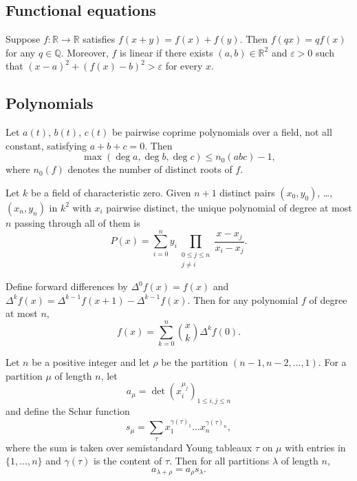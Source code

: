 \documentclass[11pt]{scrartcl}
\providecommand{\eps}{\varepsilon}
\providecommand{\QQ}{\mathbb Q}
\providecommand{\RR}{\mathbb R}
\begin{document}
\subsection{Functional equations}
\begin{theorem}
  Suppose $f \colon \RR \to \RR$ satisfies $f(x+y) = f(x) + f(y)$.
  Then $f(qx) = qf(x)$ for any $q \in \QQ$.
  Moreover, $f$ is linear if there exists $(a,b) \in \RR^2$ and $\eps > 0$
  such that $(x-a)^2 + (f(x)-b)^2 > \eps$ for every $x$.
\end{theorem}

\subsection{Polynomials}
\begin{theorem}
  Let $a(t)$, $b(t)$, $c(t)$ be pairwise coprime polynomials over a field,
  not all constant, satisfying $a + b + c = 0$.
  Then
  \[ \max(\deg a, \deg b, \deg c) \le n_0(abc) - 1, \]
  where $n_0(f)$ denotes the number of distinct roots of $f$.
\end{theorem}

\begin{theorem}
  Let $k$ be a field of characteristic zero.
  Given $n+1$ distinct pairs $(x_0, y_0)$, \dots, $(x_n, y_n)$ in $k^2$
  with $x_i$ pairwise distinct,
  the unique polynomial of degree at most $n$ passing through all of them is
  \[ P(x) = \sum_{i=0}^{n} y_i \prod_{\substack{0 \le j \le n \\ j \neq i}}
    \frac{x - x_j}{x_i - x_j}. \]
\end{theorem}

\begin{theorem}
  Define forward differences by $\Delta^0 f(x) = f(x)$
  and $\Delta^{k} f(x) = \Delta^{k-1} f(x+1) - \Delta^{k-1} f(x)$.
  Then for any polynomial $f$ of degree at most $n$,
  \[ f(x) = \sum_{k=0}^{n} \binom{x}{k} \Delta^k f(0). \]
\end{theorem}

\begin{theorem}
  Let $n$ be a positive integer and let $\rho$ be the partition $(n-1,n-2,\dots,1)$.
  For a partition $\mu$ of length $n$, let
  \[ a_\mu = \det(x_i^{\mu_j})_{1 \le i,j \le n} \]
  and define the Schur function
  \[ s_\mu = \sum_\tau x_1^{\gamma(\tau)_1}\dots x_n^{\gamma(\tau)_n}, \]
  where the sum is taken over semistandard Young tableaux $\tau$ on $\mu$
  with entries in $\{1,\dots,n\}$ and $\gamma(\tau)$ is the content of $\tau$.
  Then for all partitions $\lambda$ of length $n$,
  \[ a_{\lambda + \rho} = a_\rho s_\lambda. \]
\end{theorem}
\end{document}
